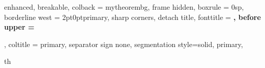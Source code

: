 
\usepackage[tmargin=2cm,rmargin=1in,lmargin=1in,margin=0.85in,bmargin=4cm,footskip=.7in]{geometry}
\usepackage{graphicx, wrapfig, subcaption, setspace, booktabs}
\usepackage[T1]{fontenc}
\usepackage[spanish]{babel}
\usepackage{xcolor}
\usepackage[protrusion=true, expansion=true]{microtype}
\usepackage{xparse}
\usepackage[scaled]{helvet}     %
\renewcommand{\familydefault}{\sfdefault}
\usepackage{amsmath,amssymb,amsfonts,latexsym,cancel,amsthm}
\usepackage[utf8]{inputenc}
\usepackage{url, lipsum}
\usepackage{tabularx}
\usepackage{float}
\usepackage{minted}



\usepackage[colorlinks=true]{hyperref}
\hypersetup{
    colorlinks=true,
    linkcolor=black,
    filecolor=magenta,
    urlcolor=blue,
}




\usepackage[most]{tcolorbox}

\setlength{\parindent}{1cm}


{%
    enhanced,
    breakable,
    colback = mytheorembg,
    frame hidden,
    boxrule = 0sp,
    borderline west = {2pt}{0pt}{primary},
    sharp corners,
    detach title,
    fonttitle = \bfseries\sffamily,
    before upper = \tcbtitle\par\smallskip,
    coltitle = primary,
    separator sign none,
    segmentation style={solid, primary},
}
{th}

